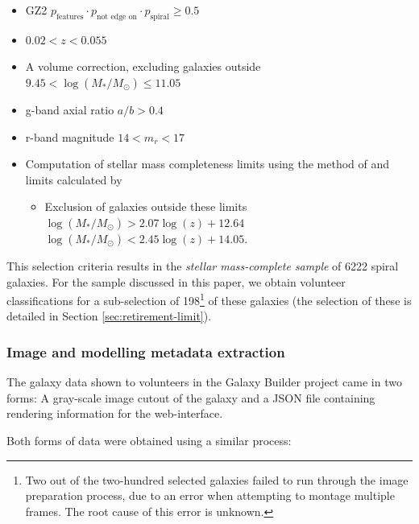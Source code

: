 \documentclass[../main.tex]{subfiles}
\begin{document}
\begin{itemize}
  \item GZ2 $p_\text{features} \cdot p_\text{not edge on} \cdot p_\text{spiral} \ge 0.5$
  \item $0.02 < z < 0.055$
  \item A volume correction, excluding galaxies outside $9.45 < \log(M_* / M_\odot) \le 11.05$
  \item g-band axial ratio $a/b > 0.4$
  \item r-band magnitude $14 < m_r < 17$
  \item Computation of stellar mass completeness limits using the method of \citet{Pozzetti2009:0907.5416v2} and limits calculated by \citet{2017MNRAS.472.2263H}
  \begin{itemize}
    \item Exclusion of galaxies outside these limits\\
      $\log({M_* / M_\odot}) > 2.07\log(z) + 12.64$\\
      $\log({M_* / M_\odot}) < 2.45\log(z) + 14.05$.
  \end{itemize}
\end{itemize}

This selection criteria results in the \textit{stellar mass-complete sample} of 6222 spiral galaxies. For the sample discussed in this paper, we obtain volunteer classifications for a sub-selection of 198\footnote{Two out of the two-hundred selected galaxies failed to run through the image preparation process, due to an error when attempting to montage multiple frames. The root cause of this error is unknown.} of these galaxies (the selection of these is detailed in Section \ref{sec:retirement-limit}).

\subsubsection{Image and modelling metadata extraction}

The galaxy data shown to volunteers in the Galaxy Builder project came in two forms: A gray-scale image cutout of the galaxy and a JSON file containing rendering information for the web-interface.

Both forms of data were obtained using a similar process:
\end{document}
